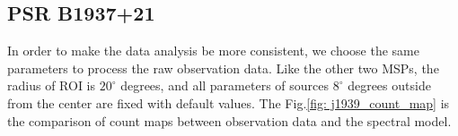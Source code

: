 \documentclass[12pt]{report}
\newcommand{\mycaption}[1]{\caption{\textit{\footnotesize #1}}}
\begin{document}
      
        \subsection{PSR B1937+21}
          In order to make the data analysis be more consistent, we choose the same parameters
          to process the raw observation data. Like the other two MSPs, the radius of ROI is $20^{\circ}$ 
          degrees, and all parameters of sources $8^{\circ}$ degrees outside from the center 
          are fixed with default values. The Fig.\ref{fig: j1939_count_map} is the 
          comparison of count maps between observation data and the spectral model. 
\end{document}
